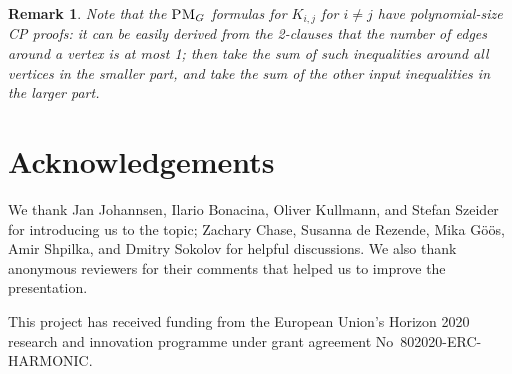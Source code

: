 \documentclass[11pt]{article}
\newcommand{\scterm}[1]{{\textrm{\sc #1}}}
\newcommand{\cp}{\scterm{CP}}
\newcommand{\PM}{\scterm{PM}}
\numberwithin{equation}{section}
\newtheorem{remark}[theorem]{Remark}
\begin{document}
\begin{remark}
Note that the $\PM_G$ formulas for $K_{i,j}$ for $i\neq j$
have polynomial-size {\cp} proofs: it can be easily derived from the 2-clauses
that the number of edges around a vertex is at most 1; then take the sum
of such inequalities around all vertices in the smaller part, and
take the sum of the other input inequalities in the larger part.
\end{remark}


\section*{Acknowledgements}
We thank Jan Johannsen, Ilario Bonacina, Oliver Kullmann, and Stefan Szeider for introducing us to the topic; Zachary Chase, Susanna de Rezende, Mika Göös, Amir Shpilka, and Dmitry Sokolov for helpful discussions. We also thank anonymous reviewers for their comments that helped us to improve the presentation.

This project has received funding from the European Union's Horizon 2020 research and innovation programme under grant agreement No~802020-ERC-HARMONIC.



\end{document}
